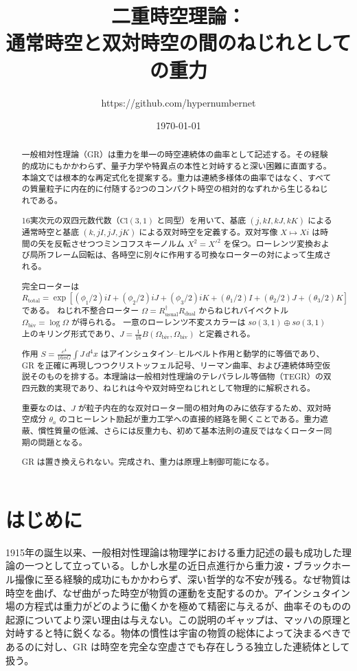 \documentclass[dvipdfmx,a4paper]{article}
\title{二重時空理論：\\通常時空と双対時空の間のねじれとしての重力}
\author{https://github.com/hypernumbernet}
\date{\today}
\begin{document}
\maketitle

\begin{abstract}
一般相対性理論（GR）は重力を単一の時空連続体の曲率として記述する。その経験的成功にもかかわらず、量子力学や特異点の本性と対峙すると深い困難に直面する。本論文では根本的な再定式化を提案する。重力は連続多様体の曲率ではなく、すべての質量粒子に内在的に付随する2つのコンパクト時空の相対的なずれから生じるねじれである。

16実次元の双四元数代数（$\mathrm{Cl}(3,1)$ と同型）を用いて、基底 $(j, kI, kJ, kK)$ による通常時空と基底 $(k, jI, jJ, jK)$ による双対時空を定義する。双対写像 $X \mapsto Xi$ は時間の矢を反転させつつミンコフスキーノルム $X^2 = X'^2$ を保つ。ローレンツ変換および局所フレーム回転は、各時空に別々に作用する可換なローターの対によって生成される。

完全ローターは $R_\text{total} = \exp[(\phi_1/2)iI + (\phi_2/2)iJ + (\phi_3/2)iK + (\theta_1/2)I + (\theta_2/2)J + (\theta_3/2)K]$ である。
ねじれ不整合ローター $\Omega = R^\dagger_\text{usual} R_\text{dual}$ からねじれバイベクトル $\Omega_\text{biv} = \log \Omega$ が得られる。
一意のローレンツ不変スカラーは $so(3,1) \oplus so(3,1)$ 上のキリング形式であり、$J = \frac{1}{16} B(\Omega_\text{biv}, \Omega_\text{biv})$ と定義される。

作用 $S = \frac{c^4}{16\pi G} \int J \, d^4x$ はアインシュタイン--ヒルベルト作用と動学的に等価であり、GR を正確に再現しつつクリストッフェル記号、リーマン曲率、および連続体時空仮説そのものを排する。本理論は一般相対性理論のテレパラレル等価物（TEGR）の双四元数的実現であり、ねじれは今や双対時空ねじれとして物理的に解釈される。

重要なのは、$J$ が粒子内在的な双対ローター間の相対角のみに依存するため、双対時空成分 $\theta_a$ のコヒーレント励起が重力工学への直接的経路を開くことである。重力遮蔽、慣性質量の低減、さらには反重力も、初めて基本法則の違反ではなくローター同期の問題となる。

GR は置き換えられない。完成され、重力は原理上制御可能になる。
\end{abstract}

\section{はじめに}
\label{sec:introduction}

1915年の誕生以来、一般相対性理論は物理学における重力記述の最も成功した理論の一つとして立っている。しかし水星の近日点進行から重力波・ブラックホール撮像に至る経験的成功にもかかわらず、深い哲学的な不安が残る。なぜ物質は時空を曲げ、なぜ曲がった時空が物質の運動を支配するのか。アインシュタイン場の方程式は重力がどのように働くかを極めて精密に与えるが、曲率そのものの起源についてより深い理由は与えない。この説明のギャップは、マッハの原理と対峙すると特に鋭くなる。物体の慣性は宇宙の物質の総体によって決まるべきであるのに対し、GR は時空を完全な空虚さでも存在しうる独立した連続体として扱う。
\end{document}
